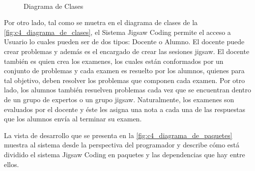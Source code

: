 \documentclass[twoside]{article}
\begin{document}
\begin{figure}
	\centering
	\\
	\caption{Diagrama de Clases}\label{fig:c4_diagrama_de_clases}
\end{figure}
\begin{multicols}{2}
Por otro lado, tal como se muetra en el diagrama de clases de la \autoref{fig:c4_diagrama_de_clases}, el Sistema Jigsaw Coding permite el acceso a Usuario lo cuales pueden ser de dos tipos: Docente o Alumno. El docente puede crear problemas y además es el encargado de crear las sesiones jigsaw. El docente también es quien crea los examenes, los cuales están conformados por un conjunto de problemas y cada examen es resuelto por los alumnos, quienes para tal objetivo, deben resolver los problemas que componen cada examen. Por otro lado, los alumnos también resuelven problemas cada vez que se encuentran dentro de un grupo de expertos o un grupo jigsaw. Naturalmente, los examenes son evaluados por el docente y éste les asigna una nota a cada una de las respuestas que los alumnos envía al terminar su examen.

La vista de desarrollo que se presenta en la \autoref{fig:c4_diagrama_de_paquetes} muestra al sistema desde la perspectiva del programador y describe cómo está dividido el sistema Jigsaw Coding en paquetes y las dependencias que hay entre ellos.
\end{multicols}
\end{document}
